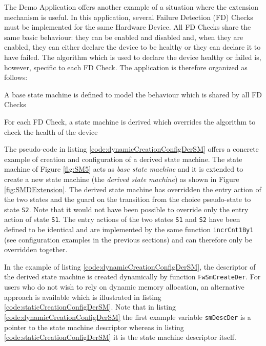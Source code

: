 \documentclass[manual]{../fwprofile}
\begin{document}
The Demo Application offers another example of a situation where the extension mechanism is useful. In this 
application, several Failure Detection (FD) Checks must be implemented for the same Hardware Device. All FD 
Checks share the same basic behaviour: they can be enabled and disabled and, when they are enabled, they can 
either declare the device to be healthy or they can declare it to have failed. The algorithm which is used to 
declare the device healthy or failed is, however, specific to each FD Check. The application is therefore organized 
as follows:

\begin{fw_itemize}
\item A base state machine is defined to model the behaviour which is shared by all FD Checks
\item For each FD Check, a state machine is derived which overrides the algorithm to check the health of the device
\end{fw_itemize}

The pseudo-code in listing \ref{code:dynamicCreationConfigDerSM} offers a concrete example of creation and 
configuration of a derived state machine. 
The state machine of Figure \ref{fig:SM5} acts as \emph{base state machine} and it is extended to create a new state 
machine (the \emph{derived state machine}) as shown in Figure \ref{fig:SMDExtension}. The derived state machine has 
overridden the entry action of the two states and the guard on the transition from the choice pseudo-state to state 
\texttt{S2}. Note that it would not have been possible to override only the entry action of state \texttt{S1}. The entry actions 
of the two states \texttt{S1} and \texttt{S2} have been defined to be identical and are implemented by the same function 
\texttt{incrCnt1By1} (see configuration examples in the previous sections) and can therefore only be overridden together. 

In the example of listing \ref{code:dynamicCreationConfigDerSM}, the descriptor of the derived state machine is created dynamically by 
function \texttt{FwSmCreateDer}. For users who do not wish to rely on dynamic memory allocation, an alternative approach 
is available which is illustrated in listing \ref{code:staticCreationConfigDerSM}. 
Note that in listing \ref{code:dynamicCreationConfigDerSM} the first example variable \texttt{smDescDer} is 
a pointer to the state machine descriptor whereas in listing \ref{code:staticCreationConfigDerSM} it is the state machine descriptor itself.
\end{document}
